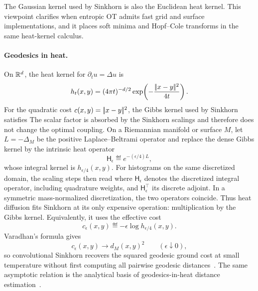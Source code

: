 The Gaussian kernel used by Sinkhorn is also the Euclidean heat kernel. This viewpoint clarifies when entropic OT admits fast grid and surface implementations, and it places soft minima and Hopf--Cole transforms in the same heat-kernel calculus.

\paragraph{Geodesics in heat.}

On $\mathbb{R}^d$, the heat kernel for $\partial_t u=\Delta u$ is
\[
	h_t(x,y)=(4\pi t)^{-d/2}\exp\!\left(-\frac{|\!| x-y |\!|^2}{4t}\right).
\]
For the quadratic cost $c(x,y)=|\!| x-y |\!|^2$, the Gibbs kernel used by Sinkhorn satisfies
The scalar factor is absorbed by the Sinkhorn scalings and therefore does not change the optimal coupling. On a Riemannian manifold or surface $M$, let $L=-\Delta_M$ be the positive Laplace--Beltrami operator and replace the dense Gibbs kernel by the intrinsic heat operator
\[
	\mathsf H_\epsilon\eqdef e^{-(\epsilon/4)L},
\]
whose integral kernel is $h_{\epsilon/4}(x,y)$. For histograms on the same discretized domain, the scaling steps then read
where $\mathsf H_\epsilon$ denotes the discretized integral operator, including quadrature weights, and $\mathsf H_\epsilon^\top$ its discrete adjoint. In a symmetric mass-normalized discretization, the two operators coincide. Thus heat diffusion fits Sinkhorn at its only expensive operation: multiplication by the Gibbs kernel. Equivalently, it uses the effective cost
\[
	c_\epsilon(x,y)\eqdef-\epsilon\log h_{\epsilon/4}(x,y).
\]
Varadhan's formula gives
\[
	c_\epsilon(x,y)\longrightarrow d_M(x,y)^2
	\qquad (\epsilon\downarrow0),
\]
so convolutional Sinkhorn recovers the squared geodesic ground cost at small temperature without first computing all pairwise geodesic distances~\cite{varadhan-1967,2015-solomon-siggraph}. The same asymptotic relation is the analytical basis of geodesics-in-heat distance estimation~\cite{Crane2013}.

